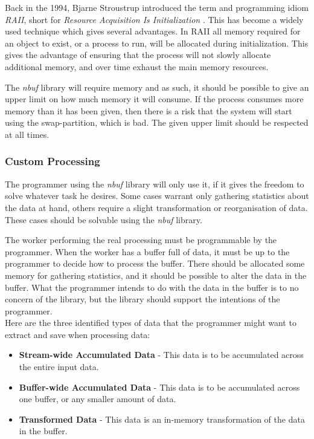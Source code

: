 \documentclass[a4paper]{article}
\newcommand{\nbuf}{\textit{nbuf} }
\begin{document}
Back in the 1994, Bjarne Stroustrup introduced the term and programming idiom \textit{RAII}, short for \textit{Resource Acquisition Is Initialization} \cite{Stroustrup:1995:DEC:193198}. This has become a widely used technique which gives several advantages. In RAII all memory required for an object to exist, or a process to run, will be allocated during initialization. This gives the advantage of ensuring that the process will not slowly allocate additional memory, and over time exhaust the main memory resources.

The \nbuf library will require memory and as such, it should be possible to give an upper limit on how much memory it will consume. If the process consumes more memory than it has been given, then there is a risk that the system will start using the swap-partition, which is bad. The given upper limit should be respected at all times.


\subsubsection{Custom Processing}
The programmer using the \nbuf library will only use it, if it gives the freedom to solve whatever task he desires. Some cases warrant only gathering statistics about the data at hand, others require a slight transformation or reorganisation of data. These cases should be solvable using the \nbuf library. 

The worker performing the real processing must be programmable by the programmer. When the worker has a buffer full of data, it must be up to the programmer to decide how to process the buffer. There should be allocated some memory for gathering statistics, and it should be possible to alter the data in the buffer. What the programmer intends to do with the data in the buffer is to no concern of the library, but the library should support the intentions of the programmer.\\

Here are the three identified types of data that the programmer might want to extract and save when processing data:
\begin{itemize}
\item \textbf{Stream-wide Accumulated Data} - This data is to be accumulated across the entire input data.
\item \textbf{Buffer-wide Accumulated Data} - This data is to be accumulated across one buffer, or any smaller amount of data.
\item \textbf{Transformed Data} - This data is an in-memory transformation of the data in the buffer.
\end{itemize}
\end{document}
